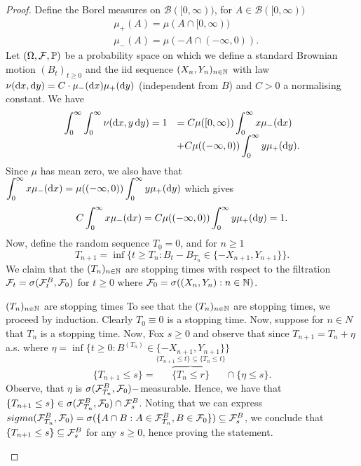 \documentclass{article}
\begin{document}
\begin{proof}
Define the Borel measures on $ \mathcal{B}([0,\infty))$, for $ A\in \mathcal{B}([0,\infty))$
    \begin{eqnarray*}
	    &\mu_{+}(A) = \mu(A\cap [0, \infty))\\
	    &\mu_{-}(A) = \mu(-A\cap (-\infty,0)).
    \end{eqnarray*}
    Let $ (\Omega, \mathcal{F}, \mathbb{P})$ be a probability space on which we define a standard Brownian motion $ (B_{t})_{t\geq 0}$ and the iid sequence $ (X_{n}, Y_{n})_{n\in \mathbb{N}}$ with law $ \nu(\operatorname{d}\! x,\operatorname{d}\! y)=C\cdot \mu_{-}(\operatorname{d}\! x)\mu_{+}(\operatorname{d}\!  y)$ (independent from $ B$) and $ C>0$ a normalising constant. We have 
    \[
    \begin{array}{ll}
        \displaystyle\int^{\infty}_{0} \displaystyle\int^{\infty}_{0} \nu( \operatorname{d}\! x,y\operatorname{d}\! y) =1    &=  C\mu([0,\infty)) \displaystyle\int^{\infty}_{0}x\mu_{-}(\operatorname{d}\! x)  \\
         &+ C\mu((-\infty, 0)) \displaystyle\int^{\infty}_{0}y\mu_{+}(\operatorname{d}\! y). 
    \end{array}
    \]
    Since $ \mu$ has mean zero, we also have that $ \displaystyle\int^{\infty}_{0}x\mu_{-} (\operatorname{d}\! x) =   \mu((-\infty, 0)) \displaystyle\int^{\infty}_{0}y\mu_{+}(\operatorname{d}\! y)$ which gives 
    \[
    C  \displaystyle\int^{\infty}_{0}x\mu_{-} (\operatorname{d}\! x)= C \mu((-\infty, 0)) \displaystyle\int^{\infty}_{0}y\mu_{+}(\operatorname{d}\! y)=1.
    \]
    Now, define the random sequence $ T_{0}=0$, and for $ n\geq 1$
    \[
	    T_{n+1}= \displaystyle\inf\{t\geq T_{n}: B_{t}-B_{T_{n}}\in \{-X_{n+1}, Y_{n+1}\}\}.
    \]
    We claim that the $ (T_{n})_{n\in \mathbb{N}}$ are stopping times with respect to the filtration $ \mathcal{F}_{t}= \sigma(\mathcal{F}^{B}_{t}, \mathcal{F}_{0})$ for $ t\geq 0$ where $ \mathcal{F}_{0} = \sigma((X_{n}, Y_{n}):n\in \mathbb{N})$.

    \begin{examplesblock}{ $(T_{n})_{n\in\mathbb{N}}$ are stopping times}\label{aside: skorokhod stopping time}
	    To see that the $(T_{n})_{n\in\mathbb{N}}$ are stopping times, we proceed by induction. Clearly $ T_{0}\equiv 0$ is a stopping time. Now, suppose for $ n\in N$ that $ T_{n}$ is a stopping time. Now, Fox $ s\geq 0$ and observe that since $ T_{n+1}=T_{n}+\eta$ a.s. where $ \eta = \displaystyle\inf\{t\geq 0 : B^{(T_{n})}\in \{-X_{n+1}, Y_{n+1}\}\}$
	    \[
		    \{T_{n+1}\leq s\} = \overbrace{\{T_{n}\leq r\}}^{\{T_{n+1}\leq t\}\subseteq \{T_{n}\leq t\}}\cap \{\eta\leq s\}.
	    \]
	    Observe, that $ \eta $ is $ \sigma(\mathcal{F}^{B}_{T_{n}}, \mathcal{F}_{0})-$measurable. Hence, we have that $ \{T_{n+1}\leq s\}\in \sigma(\mathcal{F}^{B}_{T_{n}}, \mathcal{F}_{0})\cap \mathcal{F}^{B}_{s}$. Noting that we can express $ sigma(\mathcal{F}^{B}_{T_{n}}, \mathcal{F}_{0})= \sigma(\{A\cap B: A\in \mathcal{F}^{B}_{T_{n}}, B\in \mathcal{F}_{0}\})\subseteq \mathcal{F}^{B}_{s} $, we conclude  that $ \{T_{n+1}\leq s\}\subseteq \mathcal{F}^{B}_{s}$ for any $ s\geq 0$, hence proving the statement. 
    \end{examplesblock}


\end{proof}
\end{document}
